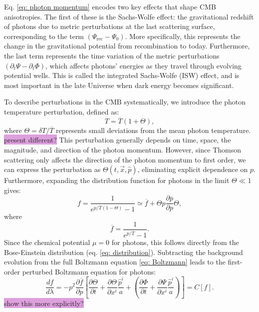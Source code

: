 \documentclass{aa}
\numberwithin{equation}{section}
\numberwithin{table}{section}
\numberwithin{figure}{section}
\begin{document}
Eq. \eqref{eq: photon momentum} encodes two key effects that shape CMB anisotropies. The first of these is the Sachs-Wolfe effect: the gravitational redshift of photons due to metric perturbations at the last scattering surface, corresponding to the term $(\Psi_{\text{rec}} - \Psi_0)$. More specifically, this represents the change in the gravitational potential from recombination to today. 
Furthermore, the last term represents the time variation of the metric perturbations $(\partial_t \Psi - \partial_t \Phi)$, which affects photons' energies as they travel through evolving potential wells. This is called the integrated Sachs-Wolfe (ISW) effect, and is most important in the late Universe when dark energy becomes significant. 


To describe perturbations in the CMB systematically, we introduce the photon temperature perturbation, defined as:
\begin{equation}
T = \overline{T} (1 + \Theta),
\end{equation}
where $\Theta = \delta T/\overline{T}$ represents small deviations from the mean photon temperature. \colorbox{Plum}{present different?} This perturbation generally depends on time, space, the magnitude, and direction of the photon momentum. However, since Thomson scattering only affects the direction of the photon momentum to first order, we can express the perturbation as $\Theta(t, \vec{x}, \hat{p})$, eliminating explicit dependence on $p$. Furthermore, expanding the distribution function for photons in the limit $\Theta \ll 1$ gives:
\begin{equation}
f = \frac{1}{e^{p/\overline{T}(1-\Theta)}-1} \simeq \overline{f} + \Theta p\frac{\partial\overline{p}}{\partial p} \Theta,
\end{equation}
where 
\begin{equation}
  \overline{f} = \frac{1}{e^{p/\overline{T}}-1}.
\end{equation}
Since the chemical potential $\mu=0$ for photons, this follows directly from the Bose-Einstein distribution (eq. \eqref{eq: distribution}). Subtracting the background evolution from the full Boltzmann equation \eqref{eq: Boltzmann} leads to the first-order perturbed Boltzmann equation for photons:
\begin{equation}
\frac{df}{d\lambda} = -p^2\frac{\partial\overline{f}}{\partial p}\left[\frac{\partial{\Theta}}{\partial t} + \frac{\partial{\Theta}}{\partial x^{i}}\frac{\hat{p}^{i}}{a} + \left(\frac{\partial{\Phi}}{\partial t} + \frac{\partial{\Psi}}{\partial x^{i}}\frac{\hat{p}^{i}}{a} \right) \right] = C[f]. \label{eq: Boltzmann photons}
\end{equation}
\colorbox{Plum}{show this more explicitly?} 
\end{document}
